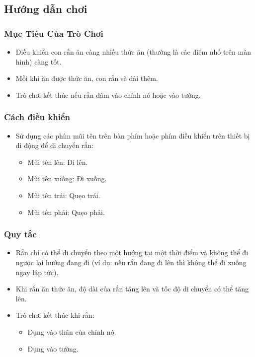 \documentclass[a4paper, 12pt]{article}
\begin{document}
\subsection{Hướng dẫn chơi}
\subsubsection{Mục Tiêu Của Trò Chơi}
\begin{itemize}
    \item Điều khiển con rắn ăn càng nhiều thức ăn (thường là các điểm nhỏ trên màn hình) càng tốt.
    \item Mỗi khi ăn được thức ăn, con rắn sẽ dài thêm.
    \item Trò chơi kết thúc nếu rắn đâm vào chính nó hoặc vào tường.
\end{itemize}

\subsubsection{Cách điều khiển}
\begin{itemize}
    \item Sử dụng các phím mũi tên trên bàn phím hoặc phím điều khiển trên thiết bị di động để di chuyển rắn:
    \begin{itemize}
        \item Mũi tên lên: Đi lên.
        \item Mũi tên xuống: Đi xuống.
        \item Mũi tên trái: Quẹo trái.
        \item Mũi tên phải: Quẹo phải.
    \end{itemize}
\end{itemize}

\subsubsection{Quy tắc}
\begin{itemize}
    \item Rắn chỉ có thể di chuyển theo một hướng tại một thời điểm và không thể đi ngược lại hướng đang đi (ví dụ: nếu rắn đang đi lên thì không thể đi xuống ngay lập tức).
    \item Khi rắn ăn thức ăn, độ dài của rắn tăng lên và tốc độ di chuyển có thể tăng lên.
    \item Trò chơi kết thúc khi rắn:
    \begin{itemize}
        \item Đụng vào thân của chính nó.
        \item Đụng vào tường.
    \end{itemize}
\end{itemize}
\end{document}
